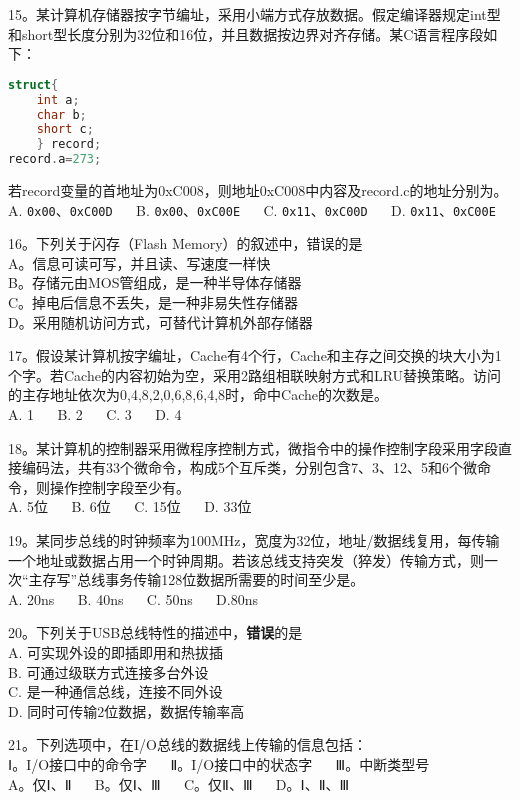 15。某计算机存储器按字节编址，采用小端方式存放数据。假定编译器规定int型和short型长度分别为32位和16位，并且数据按边界对齐存储。某C语言程序段如下：\\
\begin{lstlisting}[language=cpp]
struct{
    int a;
    char b;
    short c;
    } record;
record.a=273;
\end{lstlisting}
若record变量的首地址为0xC008，则地址0xC008中内容及record.c的地址分别为。\\
A. \verb|0x00|、\verb|0xC00D| $\quad$ B. \verb|0x00|、\verb|0xC00E| $\quad$ C. \verb|0x11|、\verb|0xC00D|  $\quad$ D. \verb|0x11|、\verb|0xC00E|

16。下列关于闪存（Flash Memory）的叙述中，错误的是\\
A。信息可读可写，并且读、写速度一样快\\
B。存储元由MOS管组成，是一种半导体存储器\\
C。掉电后信息不丢失，是一种非易失性存储器\\
D。采用随机访问方式，可替代计算机外部存储器

17。假设某计算机按字编址，Cache有4个行，Cache和主存之间交换的块大小为1个字。若Cache的内容初始为空，采用2路组相联映射方式和LRU替换策略。访问的主存地址依次为0,4,8,2,0,6,8,6,4,8时，命中Cache的次数是。\\
A. 1 $\quad$ B. 2 $\quad$ C. 3 $\quad$ D. 4

18。某计算机的控制器采用微程序控制方式，微指令中的操作控制字段采用字段直接编码法，共有33个微命令，构成5个互斥类，分别包含7、3、12、5和6个微命令，则操作控制字段至少有。\\
A. 5位 $\quad$ B. 6位 $\quad$ C. 15位 $\quad$ D. 33位

19。某同步总线的时钟频率为100MHz，宽度为32位，地址/数据线复用，每传输一个地址或数据占用一个时钟周期。若该总线支持突发（猝发）传输方式，则一次“主存写”总线事务传输128位数据所需要的时间至少是。\\
A. 20ns $\quad$ B. 40ns $\quad$ C. 50ns $\quad$ D.80ns

20。下列关于USB总线特性的描述中，\textbf{错误}的是\\
A. 可实现外设的即插即用和热拔插\\
B. 可通过级联方式连接多台外设\\
C. 是一种通信总线，连接不同外设\\
D. 同时可传输2位数据，数据传输率高

21。下列选项中，在I/O总线的数据线上传输的信息包括：\\
Ⅰ。I/O接口中的命令字 $\quad$ Ⅱ。I/O接口中的状态字  $\quad$ Ⅲ。中断类型号\\
A。仅Ⅰ、Ⅱ $\quad$ B。仅Ⅰ、Ⅲ $\quad$ C。仅Ⅱ、Ⅲ $\quad$ D。Ⅰ、Ⅱ、Ⅲ

